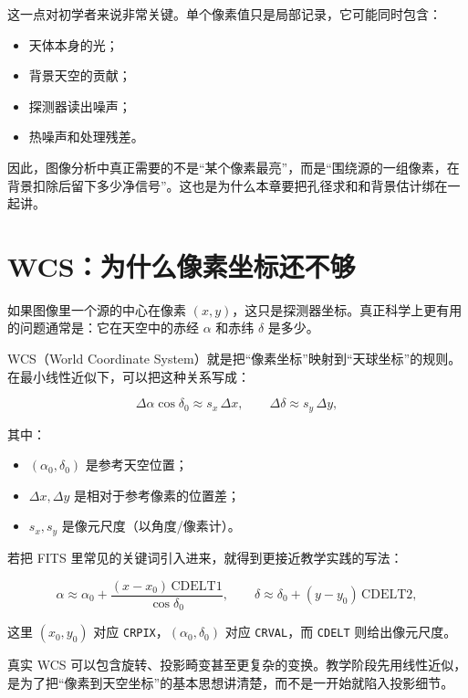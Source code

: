 这一点对初学者来说非常关键。单个像素值只是局部记录，它可能同时包含：

\begin{itemize}
    \item 天体本身的光；
    \item 背景天空的贡献；
    \item 探测器读出噪声；
    \item 热噪声和处理残差。
\end{itemize}

因此，图像分析中真正需要的不是“某个像素最亮”，而是“围绕源的一组像素，在背景扣除后留下多少净信号”。这也是为什么本章要把孔径求和和背景估计绑在一起讲。

\section{WCS：为什么像素坐标还不够}

如果图像里一个源的中心在像素 $(x,y)$，这只是探测器坐标。真正科学上更有用的问题通常是：它在天空中的赤经 $\alpha$ 和赤纬 $\delta$ 是多少。

WCS（World Coordinate System）就是把“像素坐标”映射到“天球坐标”的规则。在最小线性近似下，可以把这种关系写成：

\[
\Delta \alpha \cos \delta_0 \approx s_x \, \Delta x,
\qquad
\Delta \delta \approx s_y \, \Delta y,
\]

其中：

\begin{itemize}
    \item $(\alpha_0,\delta_0)$ 是参考天空位置；
    \item $\Delta x, \Delta y$ 是相对于参考像素的位置差；
    \item $s_x, s_y$ 是像元尺度（以角度/像素计）。
\end{itemize}

若把 FITS 里常见的关键词引入进来，就得到更接近教学实践的写法：

\[
\alpha \approx \alpha_0 + \frac{(x-x_0)\,\mathrm{CDELT1}}{\cos\delta_0},
\qquad
\delta \approx \delta_0 + (y-y_0)\,\mathrm{CDELT2},
\]

这里 $(x_0,y_0)$ 对应 \texttt{CRPIX}，$(\alpha_0,\delta_0)$ 对应 \texttt{CRVAL}，而 \texttt{CDELT} 则给出像元尺度。

\begin{protip}
真实 WCS 可以包含旋转、投影畸变甚至更复杂的变换。教学阶段先用线性近似，是为了把“像素到天空坐标”的基本思想讲清楚，而不是一开始就陷入投影细节。
\end{protip}

